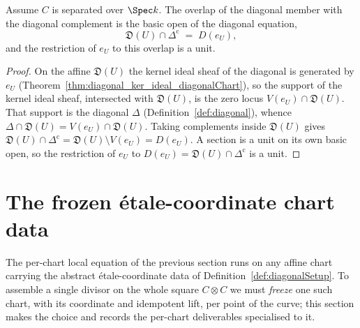 \begin{theorem}
  \label{thm:diagonalChart_inf_diagonalComplement}
  \leanok
  Assume \(C\) is separated over \(\Spec k\). The overlap of the diagonal member with the diagonal
  complement is the basic open of the diagonal equation,
  \[
    \mathfrak D(U) \cap \Delta^{\mathrm{c}} \;=\; D(e_U),
  \]
  and the restriction of \(e_U\) to this overlap is a unit.
\end{theorem}
\begin{proof}
  \leanok
  On the affine \(\mathfrak D(U)\) the kernel ideal sheaf of the diagonal is generated by \(e_U\)
  (Theorem~\ref{thm:diagonal_ker_ideal_diagonalChart}), so the support of the kernel ideal sheaf,
  intersected with \(\mathfrak D(U)\), is the zero locus \(V(e_U) \cap \mathfrak D(U)\). That
  support is the diagonal \(\Delta\) (Definition~\ref{def:diagonal}), whence
  \(\Delta \cap \mathfrak D(U) = V(e_U) \cap \mathfrak D(U)\). Taking complements inside
  \(\mathfrak D(U)\) gives
  \(\mathfrak D(U) \cap \Delta^{\mathrm{c}} = \mathfrak D(U) \setminus V(e_U) = D(e_U)\). A section
  is a unit on its own basic open, so the restriction of \(e_U\) to
  \(D(e_U) = \mathfrak D(U) \cap \Delta^{\mathrm{c}}\) is a unit.
\end{proof}

\section{The frozen étale-coordinate chart data}

The per-chart local equation of the previous section runs on any affine chart carrying the
abstract étale-coordinate data of Definition~\ref{def:diagonalSetup}. To assemble a single
divisor on the whole square \(C \otimes C\) we must \emph{freeze} one such chart, with its
coordinate and idempotent lift, per point of the curve; this section makes the choice and
records the per-chart deliverables specialised to it.

